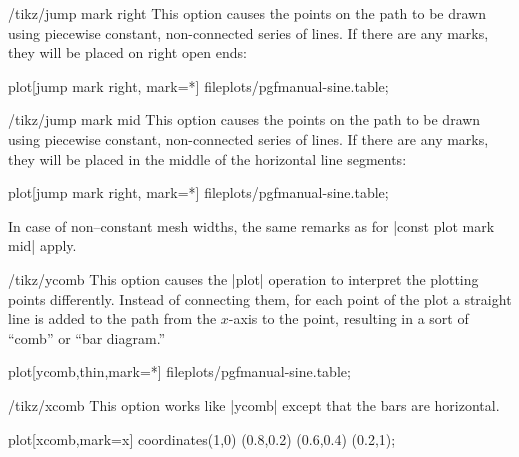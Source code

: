 \begin{key}{/tikz/jump mark right}
  This option causes the points on the path to be drawn using piecewise constant, non-connected series of lines. If there are any marks, they will be placed on right open ends:

\begin{codeexample}[]
\tikz\draw plot[jump mark right, mark=*] file{plots/pgfmanual-sine.table};
\end{codeexample}
\end{key}

\begin{key}{/tikz/jump mark mid}
  This option causes the points on the path to be drawn using piecewise constant, non-connected series of lines. If there are any marks, they will be placed in the middle of the horizontal line segments:

\begin{codeexample}[]
\tikz\draw plot[jump mark right, mark=*] file{plots/pgfmanual-sine.table};
\end{codeexample}

	In case of non--constant mesh widths, the same remarks as for |const plot mark mid| apply.
\end{key}

\begin{key}{/tikz/ycomb}
  This option causes the |plot| operation to interpret the plotting
  points differently. Instead of connecting them, for each point of
  the plot a straight line is added to the path from the $x$-axis to the point,
  resulting in a sort of ``comb'' or ``bar diagram.''

\begin{codeexample}[]
\tikz{} plot[ycomb,thin,mark=*] file{plots/pgfmanual-sine.table};
\end{codeexample}

\begin{codeexample}[]
\end{codeexample}
\end{key}


\begin{key}{/tikz/xcomb}
  This option works like |ycomb| except that the bars are horizontal.

\begin{codeexample}[]
\tikz \draw plot[xcomb,mark=x] coordinates{(1,0) (0.8,0.2) (0.6,0.4) (0.2,1)};
\end{codeexample}
\end{key}


